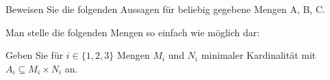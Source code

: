 \documentclass[10pt, a4paper]{exam}
\begin{document}
\begin{questions}
\begin{solution}
    \end{solution}

    \question Beweisen Sie die folgenden Aussagen für beliebig gegebene Mengen A, B, C.

    \question Man stelle die folgenden Mengen so einfach wie möglich dar:

    \question Geben Sie für $i\in\{1, 2, 3\}$ Mengen $M_i$ und $N_i$ minimaler Kardinalität mit $A_i\subseteq M_i \times N_i$ an.
\end{questions}
\end{document}
